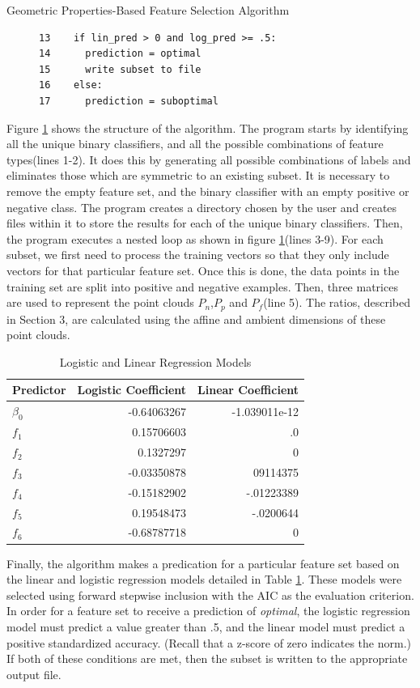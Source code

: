 \documentclass{llncs}
\begin{document}
\begin{section}{Geometric Properties-Based Feature Selection Algorithm}
\begin{figure}[h]
\begin{lstlisting}
13	  if lin_pred > 0 and log_pred >= .5:
14		prediction = optimal
15		write subset to file
16	  else:
17		prediction = suboptimal
\end{lstlisting}
\label{fig:code}
\end{figure}
Figure \ref{fig:code} shows the structure of the algorithm. The program starts by identifying all the unique binary classifiers, and all the possible combinations of feature types(lines 1-2). It does this by generating all possible combinations of  labels and eliminates those which are symmetric to an existing subset. It is necessary to remove the empty feature set, and the binary classifier with an empty positive or negative class. The program creates a directory chosen by the user and creates files within it to store the results for each of the unique binary classifiers. Then, the program executes a nested loop as shown in figure \ref{fig:code}(lines 3-9). 
For each subset, we first need to process the training vectors so that they only include vectors for that particular feature set. Once this is done, the data points in the training set are split into positive and negative examples. Then, three matrices are used to represent the point clouds $P_n$,$P_p$ and $P_f$(line 5). The ratios, described in Section 3, are calculated using the affine and ambient dimensions of these point clouds.
\begin{table}[ht]
\centering
\caption{Logistic and Linear Regression Models}
\begin{tabular}{l r r }
\hline \hline
Predictor&Logistic Coefficient & Linear Coefficient \\
\hline
$\beta_0$&-0.64063267&-1.039011e-12\\
$f_1$&0.15706603&.0\\
$f_2$&0.1327297& 0\\
$f_3$&-0.03350878&09114375\\
$f_4$&-0.15182902& -.01223389\\
$f_5$&0.19548473&-.0200644\\
$f_6$&-0.68787718&0\\
\hline
\end{tabular}
\label{tab:models}
\end{table}

Finally, the algorithm makes a predication for a particular feature set based on the linear and logistic regression models detailed in Table \ref{tab:models}. These models were selected using forward stepwise inclusion with the AIC as the evaluation criterion. In order for a feature set to receive a prediction of {\em optimal}, the logistic regression model must predict a value greater than .5, and the linear model must predict a positive standardized accuracy. (Recall that a z-score of zero indicates the norm.) If both of these conditions are met, then the subset is written to the appropriate output file.
 

\end{section}
\end{document}
